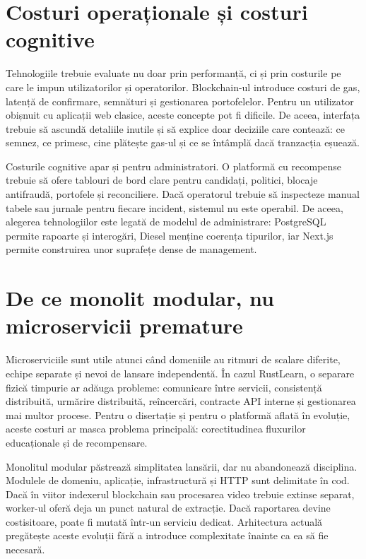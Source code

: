 \section{Costuri operaționale și costuri cognitive}
Tehnologiile trebuie evaluate nu doar prin performanță, ci și prin costurile pe care le impun utilizatorilor și operatorilor. Blockchain-ul introduce costuri de gas, latență de confirmare, semnături și gestionarea portofelelor. Pentru un utilizator obișnuit cu aplicații web clasice, aceste concepte pot fi dificile. De aceea, interfața trebuie să ascundă detaliile inutile și să explice doar deciziile care contează: ce semnez, ce primesc, cine plătește gas-ul și ce se întâmplă dacă tranzacția eșuează.

Costurile cognitive apar și pentru administratori. O platformă cu recompense trebuie să ofere tablouri de bord clare pentru candidați, politici, blocaje antifraudă, portofele și reconciliere. Dacă operatorul trebuie să inspecteze manual tabele sau jurnale pentru fiecare incident, sistemul nu este operabil. De aceea, alegerea tehnologiilor este legată de modelul de administrare: PostgreSQL permite rapoarte și interogări, Diesel menține coerența tipurilor, iar Next.js permite construirea unor suprafețe dense de management.

\section{De ce monolit modular, nu microservicii premature}
Microserviciile sunt utile atunci când domeniile au ritmuri de scalare diferite, echipe separate și nevoi de lansare independentă. În cazul RustLearn, o separare fizică timpurie ar adăuga probleme: comunicare între servicii, consistență distribuită, urmărire distribuită, reîncercări, contracte API interne și gestionarea mai multor procese. Pentru o disertație și pentru o platformă aflată în evoluție, aceste costuri ar masca problema principală: corectitudinea fluxurilor educaționale și de recompensare.

Monolitul modular păstrează simplitatea lansării, dar nu abandonează disciplina. Modulele de domeniu, aplicație, infrastructură și HTTP sunt delimitate în cod. Dacă în viitor indexerul blockchain sau procesarea video trebuie extinse separat, worker-ul oferă deja un punct natural de extracție. Dacă raportarea devine costisitoare, poate fi mutată într-un serviciu dedicat. Arhitectura actuală pregătește aceste evoluții fără a introduce complexitate înainte ca ea să fie necesară.

